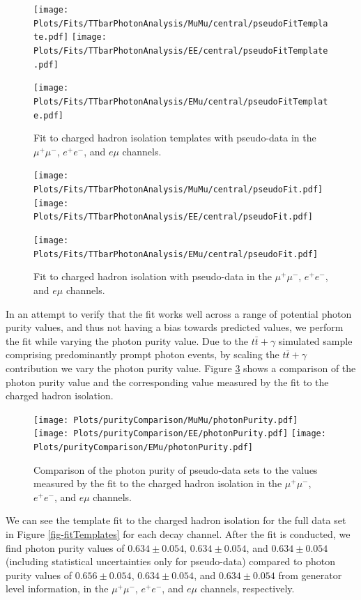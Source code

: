 \begin{figure}
\texttt{[image: Plots/Fits/TTbarPhotonAnalysis/MuMu/central/pseudoFitTemplate.pdf]}
\texttt{[image: Plots/Fits/TTbarPhotonAnalysis/EE/central/pseudoFitTemplate.pdf]}\\
\begin{center}
\texttt{[image: Plots/Fits/TTbarPhotonAnalysis/EMu/central/pseudoFitTemplate.pdf]}
\end{center}
\caption{Fit to charged hadron isolation templates with pseudo-data in the $\mu^{+}\mu^{-}$, $e^{+}e^{-}$, and $e\mu$ channels.}
\label{fig-pseudofitTemplates}
\end{figure}

\begin{figure}
\texttt{[image: Plots/Fits/TTbarPhotonAnalysis/MuMu/central/pseudoFit.pdf]}
\texttt{[image: Plots/Fits/TTbarPhotonAnalysis/EE/central/pseudoFit.pdf]}\\
\begin{center}
\texttt{[image: Plots/Fits/TTbarPhotonAnalysis/EMu/central/pseudoFit.pdf]}
\end{center}
\caption{Fit to charged hadron isolation with pseudo-data in the $\mu^{+}\mu^{-}$, $e^{+}e^{-}$, and $e\mu$ channels.}
\label{fig-pseudofit}
\end{figure}

In an attempt to verify that the fit works well across a range of potential photon purity values, and thus not having a bias towards predicted values, we perform the fit while varying the photon purity value. Due to the $t\bar{t}+\gamma$ simulated sample comprising predominantly prompt photon events, by scaling the $t\bar{t}+\gamma$ contribution we vary the photon purity value. Figure \ref{fig-photonPurityComparison} shows a comparison of the photon purity value and the corresponding value measured by the fit to the charged hadron isolation. 


\begin{figure}
\texttt{[image: Plots/purityComparison/MuMu/photonPurity.pdf]}
\texttt{[image: Plots/purityComparison/EE/photonPurity.pdf]}
\texttt{[image: Plots/purityComparison/EMu/photonPurity.pdf]}
\caption{Comparison of the photon purity of pseudo-data sets to the values measured by the fit to the charged hadron isolation in the $\mu^{+}\mu^{-}$, $e^{+}e^{-}$, and $e\mu$ channels.}
\label{fig-photonPurityComparison}
\end{figure}

We can see the template fit to the charged hadron isolation for the full data set in Figure \ref{fig-fitTemplates} for each decay channel. After the fit is conducted, we find photon purity values of $0.634 \pm 0.054$, $0.634 \pm 0.054$, and $0.634 \pm 0.054$ (including statistical uncertainties only for pseudo-data) compared to photon purity values of $0.656 \pm 0.054$, $0.634 \pm 0.054$, and $0.634 \pm 0.054$ from generator level information, in the $\mu^{+}\mu^{-}$, $e^{+}e^{-}$, and $e\mu$ channels, respectively. 

